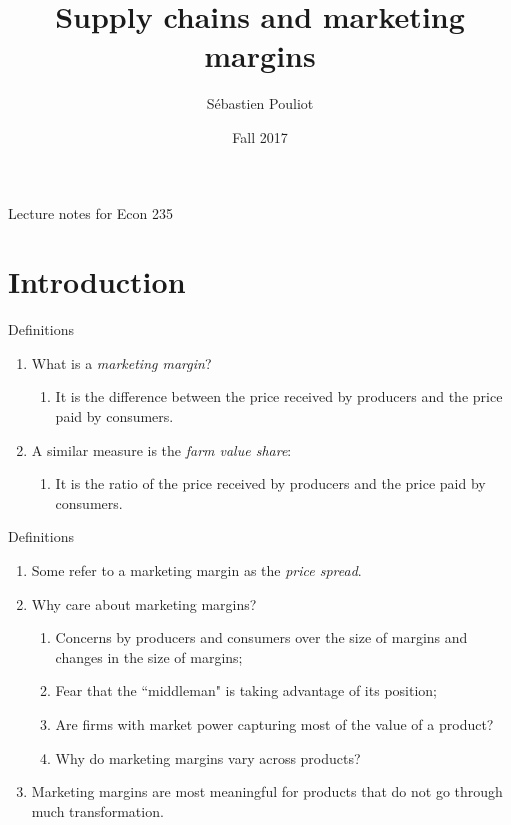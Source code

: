 \documentclass[table,xcolor=pdftex,dvipsnames, handout]{beamer}\usepackage[]{graphicx}\usepackage[]{color}
\title[Marketing margins]{Supply chains and marketing margins}
\author[Pouliot]{S\'{e}bastien Pouliot}
\institute{Iowa State University}
\date{Fall 2017}
\begin{document}

\begin{frame}
\titlepage
\vspace{-0.4in}
\begin{center}
Lecture notes for Econ 235\\
\end{center}
\end{frame}

\section[Introduction]{Introduction}

\begin{frame}{Definitions}
\begin{enumerate}[label=\textbullet]
  \item What is a \emph{marketing margin}?
      \begin{enumerate}[label=-]
          \item It is the difference between the price received by producers and the price paid by consumers.
      \end{enumerate}
  \item A similar measure is the \emph{farm value share}:
      \begin{enumerate}[label=-]
          \item It is the ratio of the price received by producers and the price paid by consumers.
      \end{enumerate}
\end{enumerate}
\end{frame}



\begin{frame}{Definitions}
\begin{enumerate}[label=\textbullet]
  \item Some refer to a marketing margin as the \emph{price spread}.
  \item Why care about marketing margins?
      \begin{enumerate}[label=-]
          \item Concerns by producers and consumers over the size of margins and changes in the size of margins;
          \item Fear that the ``middleman" is taking advantage of its position;
          \item Are firms with market power capturing most of the value of a product?
          \item Why do marketing margins vary across products?
      \end{enumerate}
  \item Marketing margins are most meaningful for products that do not go through much transformation.
\end{enumerate}
\end{frame}
\end{document}
